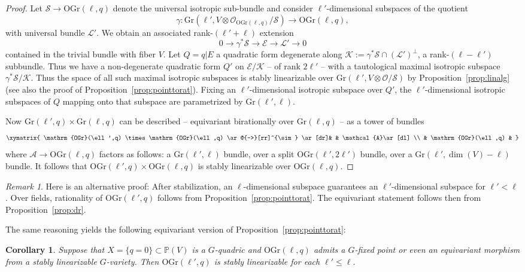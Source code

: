 \documentclass[12pt]{amsart}
\numberwithin{equation}{section}
\newcommand{\ra}{\rightarrow}
\newcommand{\bP}{\mathbb{P}}
\newcommand{\cA}{\mathcal{A}}
\newcommand{\cE}{\mathcal{E}}
\newcommand{\cL}{\mathcal{L}}
\newcommand{\cK}{\mathcal{K}}
\newcommand{\cO}{\mathcal{O}}
\newcommand{\cS}{\mathcal{S}}
\newcommand{\Gr}{\mathrm{Gr}}
\newcommand{\OGr}{\mathrm{OGr}}
\theoremstyle{plain}
\newtheorem{coro}[prop]{Corollary}
\theoremstyle{definition}
\theoremstyle{remark}
\newtheorem{rema}[prop]{Remark}
\begin{document}
\begin{proof}
Let $\cS \ra \OGr(\ell,q)$ denote the
universal isotropic sub-bundle and consider $\ell'$-dimensional
subspaces of the quotient
$$\gamma:\Gr(\ell',V\otimes \cO_{\OGr(\ell,q)}/\cS) \ra \OGr(\ell,q),$$
with universal bundle $\cL'$. We obtain an associated rank-$(\ell'+\ell)$ extension
$$0 \ra \gamma^*\cS \ra \cE \ra \cL' \ra 0$$
contained in the trivial bundle with fiber $V$. Let $Q=q|E$
a quadratic form degenerate along $\cK:=\gamma^*\cS \cap (\cL')^{\perp}$, a 
rank-$(\ell-\ell')$ subbundle. Thus we have a non-degenerate quadratic form $Q'$
on $\cE/\cK$ -- of rank $2\ell'$ -- with a tautological maximal isotropic
subspace $\gamma^*\cS/\cK$. Thus the space of all such maximal isotropic
subspaces is stably linearizable over $\Gr(\ell',V\otimes \cO/\cS)$ by Proposition~\ref{prop:linalg} (see also the
proof of Proposition~\ref{prop:pointtorat}).
Fixing an $\ell'$-dimensional isotropic subspace over $Q'$, the $\ell'$-dimensional isotropic subspaces of $Q$ mapping onto that subspace are parametrized by $\Gr(\ell',\ell)$.

Now $\Gr(\ell',q)\times \Gr(\ell,q)$ can be described -- equivariant birationally over $\Gr(\ell,q)$ -- as a tower of bundles
$$
\xymatrix{
\OGr(\ell',q) \times \OGr(\ell,q)
\ar@{-->}[rr]^{\sim} \ar[dr]& &
\cA \ar[dl] \\
    & \OGr(\ell,q) & 
}
$$
where $\cA \ra \OGr(\ell,q)$ factors as follows:
a $\Gr(\ell',\ell)$ bundle, over a split $\OGr(\ell',2\ell')$ bundle, over a
$\Gr(\ell',\dim(V)-\ell)$ bundle. It follows that $\OGr(\ell',q) \times \OGr(\ell,q)$
is stably linearizable over $\OGr(\ell,q)$.
\end{proof}

\begin{rema}
Here is an alternative proof: After stabilization, an $\ell$-dimensional subspace
guarantees an $\ell'$-dimensional subspace for $\ell'<\ell$. Over fields, 
rationality of $\OGr(\ell',q)$ follows from Proposition~\ref{prop:pointtorat}. 
The equivariant statement follows then from Proposition~\ref{prop:dr}. \end{rema}

The same reasoning yields the following equivariant version
of Proposition~\ref{prop:pointtorat}:
\begin{coro} \label{coro:fixedtorat}
Suppose that $X=\{q=0\} \subset \bP(V)$ is a $G$-quadric
and $\OGr(\ell,q)$ admits a $G$-fixed point or even an
equivariant morphism from a stably linearizable $G$-variety. Then
$\OGr(\ell',q)$ is stably linearizable for each $\ell' \le \ell$.
\end{coro}
\end{document}
